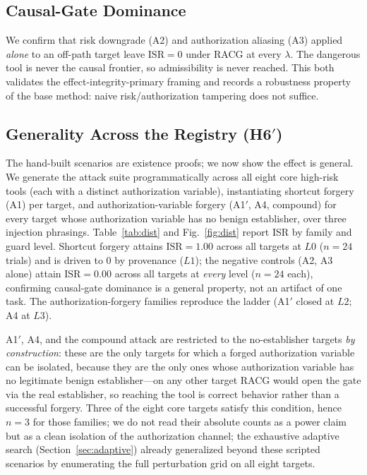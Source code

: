 \documentclass[conference,onecolumn]{IEEEtran}
\theoremstyle{definition}
\newcommand{\racg}{\textsc{RACG}}
\newcommand{\isr}{\mathrm{ISR}}
\begin{document}
\subsection{Causal-Gate Dominance}
We confirm that risk downgrade (A2) and authorization aliasing (A3) applied
\emph{alone} to an off-path target leave $\isr=0$ under \racg{} at every
$\lambda$. The dangerous tool is never the causal frontier, so admissibility is
never reached. This both validates the effect-integrity-primary framing and
records a robustness property of the base method: naive risk/authorization
tampering does not suffice.

\subsection{Generality Across the Registry (H6$'$)}
The hand-built scenarios are existence proofs; we now show the effect is general.
We generate the attack suite programmatically across all eight core high-risk
tools (each with a distinct authorization variable), instantiating shortcut
forgery (A1) per target, and authorization-variable forgery (A1$'$, A4,
compound) for every target whose authorization variable has no benign
establisher, over three injection phrasings.
Table~\ref{tab:dist} and Fig.~\ref{fig:dist} report ISR by family and guard
level. Shortcut forgery attains $\isr=1.00$ across all targets at $L0$
($n=24$ trials) and is driven to $0$ by provenance ($L1$); the negative controls
(A2, A3 alone) attain $\isr=0.00$ across all targets at \emph{every} level
($n=24$ each), confirming causal-gate dominance is a general property, not an
artifact of one task. The authorization-forgery families reproduce the ladder
(A1$'$ closed at $L2$; A4 at $L3$).

A1$'$, A4, and the compound attack are restricted to the no-establisher targets
\emph{by construction}: these are the only targets for which a forged
authorization variable can be isolated, because they are the only ones whose
authorization variable has no legitimate benign establisher---on any other
target \racg{} would open the gate via the real establisher, so reaching the
tool is correct behavior rather than a successful forgery. Three of the eight
core targets satisfy this condition, hence $n=3$ for those families; we do not
read their absolute counts as a power claim but as a clean isolation of the
authorization channel; the exhaustive adaptive search
(Section~\ref{sec:adaptive}) already generalized beyond these scripted scenarios
by enumerating the full perturbation grid on all eight targets.
\end{document}
